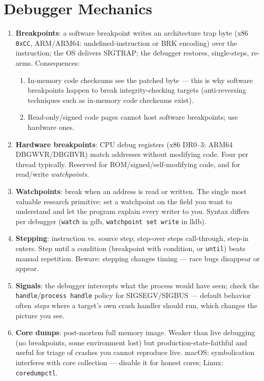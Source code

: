 \documentclass[12pt]{Training}
\begin{document}
\section*{Debugger Mechanics}
\begin{enumerate}
    \item \textbf{Breakpoints}: a software breakpoint writes an architecture trap byte (x86 \lstinline{0xCC}, ARM/ARM64: undefined-instruction or BRK encoding) over the instruction; the OS delivers SIGTRAP; the debugger restores, single-steps, re-arms. Consequences:
    \begin{enumerate}
        \item In-memory code checksums see the patched byte --- this is why software breakpoints happen to break integrity-checking targets (anti-reversing techniques such as in-memory code checksums exist).
        \item Read-only/signed code pages cannot host software breakpoints; use hardware ones.
    \end{enumerate}
    \item \textbf{Hardware breakpoints}: CPU debug registers (x86 DR0--3; ARM64 DBGWVR/DBGBVR) match addresses without modifying code. Four per thread typically. Reserved for ROM/signed/self-modifying code, and for read/write \emph{watchpoints}.
    \item \textbf{Watchpoints}: break when an address is read or written. The single most valuable research primitive: set a watchpoint on the field you want to understand and let the program explain every writer to you. Syntax differs per debugger (\lstinline{watch} in gdb, \lstinline{watchpoint set write} in lldb).
    \item \textbf{Stepping}: instruction vs. source step; step-over steps call-through, step-in enters. Step until a condition (breakpoint with condition, or \lstinline{until}) beats manual repetition. Beware: stepping changes timing --- race bugs disappear or appear.
    \item \textbf{Signals}: the debugger intercepts what the process would have seen; check the \lstinline{handle}/\lstinline{process handle} policy for SIGSEGV/SIGBUS --- default behavior often \emph{stops} where a target's own crash handler should run, which changes the picture you see.
    \item \textbf{Core dumps}: post-mortem full memory image. Weaker than live debugging (no breakpoints, some environment lost) but production-state-faithful and useful for triage of crashes you cannot reproduce live. macOS: symbolication interferes with core collection --- disable it for honest cores; Linux: \lstinline{coredumpctl}.

\end{enumerate}
\end{document}
